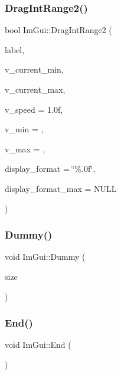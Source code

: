 \hypertarget{namespace_im_gui_a6aaacf92126bf45ce0e58348b5297a43}{}\label{namespace_im_gui_a6aaacf92126bf45ce0e58348b5297a43} 
\subsubsection{\texorpdfstring{Drag\+Int\+Range2()}{DragIntRange2()}}
{\footnotesize\ttfamily bool Im\+Gui\+::\+Drag\+Int\+Range2 (\begin{DoxyParamCaption}\item[{const char $\ast$}]{label,  }\item[{int $\ast$}]{v\+\_\+current\+\_\+min,  }\item[{int $\ast$}]{v\+\_\+current\+\_\+max,  }\item[{float}]{v\+\_\+speed = {\ttfamily 1.0f},  }\item[{int}]{v\+\_\+min = {},  }\item[{int}]{v\+\_\+max = {},  }\item[{const char $\ast$}]{display\+\_\+format = {\ttfamily \char`\"{}\%.0f\char`\"{}},  }\item[{const char $\ast$}]{display\+\_\+format\+\_\+max = {\ttfamily NULL} }\end{DoxyParamCaption})}

\hypertarget{namespace_im_gui_a8b0fb07113251301ff897b8578a53f34}{}\label{namespace_im_gui_a8b0fb07113251301ff897b8578a53f34} 
\subsubsection{\texorpdfstring{Dummy()}{Dummy()}}
{\footnotesize\ttfamily void Im\+Gui\+::\+Dummy (\begin{DoxyParamCaption}\item[{const \hyperlink{struct_im_vec2}{Im\+Vec2} \&}]{size }\end{DoxyParamCaption})}

\hypertarget{namespace_im_gui_a5479d93794a004c67ceb6d13f37c8254}{}\label{namespace_im_gui_a5479d93794a004c67ceb6d13f37c8254} 
\subsubsection{\texorpdfstring{End()}{End()}}
{\footnotesize\ttfamily void Im\+Gui\+::\+End (\begin{DoxyParamCaption}{ }\end{DoxyParamCaption})}

